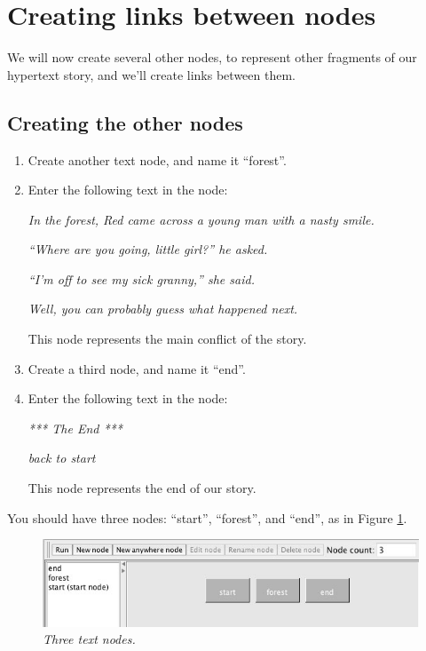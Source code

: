 \documentclass{article}
\begin{document}
\section{Creating links between nodes}

We will now create several other nodes, to represent other fragments of our
hypertext story, and we'll create links between them.

\subsection{Creating the other nodes}

\begin{enumerate}
  \item Create another text node, and name it ``forest''.
  \item Enter the following text in the node:

\textit{In the forest, Red came across a young man with a nasty smile.}

\textit{``Where are you going, little girl?'' he asked.}

\textit{``I'm off to see my sick granny,'' she said.}

\textit{Well, you can probably guess what happened next.}

This node represents the main conflict of the story.

\item Create a third node, and name it ``end''.
\item Enter the following text in the node:

\textit{*** The End ***}

\textit{back to start}

This node represents the end of our story.
\end{enumerate}

You should have three nodes: ``start'', ``forest'', and ``end'', as in
Figure \ref{fig:tut1:three_nodes}.

 
\begin{figure}[ht]
  \centering
  \includegraphics[width=12cm]{images/hypedyn-tutorial-1-figure-6}
  \caption{\textit{Three text nodes.}}
  \label{fig:tut1:three_nodes}
\end{figure} 
\end{document}
